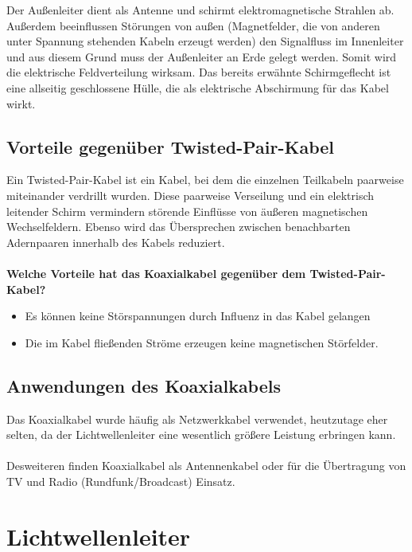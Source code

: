 \documentclass[11pt, a4paper]{article}
\begin{document}
\newpage
Der Außenleiter dient als Antenne und schirmt elektromagnetische Strahlen ab. Außerdem
beeinflussen Störungen von außen (Magnetfelder, die von anderen unter Spannung stehenden Kabeln erzeugt werden) den Signalfluss im Innenleiter und aus diesem Grund muss der
Außenleiter an Erde gelegt werden. Somit wird die elektrische Feldverteilung wirksam. Das bereits erwähnte Schirmgeflecht ist eine allseitig geschlossene Hülle, die als elektrische Abschirmung  für das Kabel wirkt.

\subsection{Vorteile gegenüber Twisted-Pair-Kabel}
Ein Twisted-Pair-Kabel ist ein Kabel, bei dem die einzelnen Teilkabeln paarweise miteinander verdrillt wurden. Diese paarweise Verseilung und ein elektrisch leitender Schirm vermindern störende Einflüsse von äußeren magnetischen Wechselfeldern. Ebenso wird das Übersprechen zwischen benachbarten
Adernpaaren innerhalb des Kabels reduziert.\\ \\
\textbf{Welche Vorteile hat das Koaxialkabel gegenüber dem Twisted-Pair-Kabel?}
\begin{itemize}
\item Es können keine Störspannungen durch Influenz in das Kabel gelangen
\item Die im Kabel fließenden Ströme erzeugen keine magnetischen Störfelder.
\end{itemize}

\subsection{Anwendungen des Koaxialkabels}
Das Koaxialkabel wurde häufig als Netzwerkkabel verwendet, heutzutage eher selten, da der Lichtwellenleiter eine wesentlich größere Leistung erbringen kann. \\ \\
Desweiteren finden Koaxialkabel als Antennenkabel oder für die Übertragung von TV und Radio (Rundfunk/Broadcast) Einsatz.

\section{Lichtwellenleiter \cite{lwl}}
\end{document}
